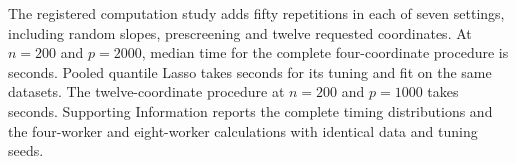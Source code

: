 


The registered computation study adds fifty repetitions in each of
seven settings, including random slopes, prescreening and twelve
requested coordinates. At $n=200$ and $p=2000$, median time for the
complete four-coordinate procedure is
\SubmissionTimingJointHigh{} seconds. Pooled quantile Lasso takes
\SubmissionTimingPooledHigh{} seconds for its tuning and fit on
the same datasets. The twelve-coordinate procedure at $n=200$ and
$p=1000$ takes \SubmissionTimingTwelve{} seconds. Supporting
Information reports the complete timing distributions and the
four-worker and eight-worker calculations with identical data
and tuning seeds.
